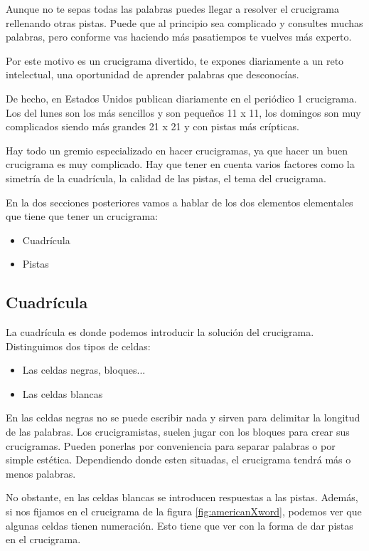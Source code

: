 \documentclass[12pt, a4paper]{article}
\begin{document}
Aunque no te sepas todas las palabras puedes llegar a resolver el crucigrama
rellenando otras pistas. Puede que al principio sea complicado y
consultes muchas palabras, pero conforme vas haciendo más pasatiempos te vuelves
más experto.

Por este motivo es un crucigrama divertido, te expones diariamente a un reto 
intelectual, una oportunidad de aprender palabras que desconocías.

De hecho, en Estados Unidos publican diariamente en el periódico
1 crucigrama. Los del lunes son los más sencillos y son pequeños 11 x 11,
los domingos son muy complicados siendo más grandes 21 x 21 y con pistas
más crípticas.

Hay todo un gremio especializado en hacer crucigramas, ya que hacer un buen
crucigrama es muy complicado. Hay que tener en cuenta varios factores como la simetría
de la cuadrícula, la calidad de las pistas, el tema del crucigrama.

En la dos secciones posteriores vamos a hablar de los dos elementos elementales que 
tiene que tener un crucigrama:

\begin{itemize}
	\item Cuadrícula
	\item Pistas
\end{itemize}

\subsection{Cuadrícula}

La cuadrícula es donde podemos introducir la solución del crucigrama. Distinguimos
dos tipos de celdas:

\begin{itemize}
	\item Las celdas negras, bloques...
	\item Las celdas blancas
\end{itemize}

En las celdas negras no se puede escribir nada y sirven para delimitar
la longitud de las palabras. Los crucigramistas, suelen jugar con los bloques
para crear sus crucigramas. Pueden ponerlas por conveniencia para separar
palabras o por simple estética. Dependiendo donde esten situadas, el
crucigrama tendrá más o menos palabras.

No obstante, en las celdas blancas se introducen respuestas a las pistas. 
Además, si nos fijamos en el crucigrama de la figura \ref{fig:americanXword},
podemos ver que algunas celdas tienen numeración. Esto tiene que ver con la
forma de dar pistas en el crucigrama.
\end{document}
